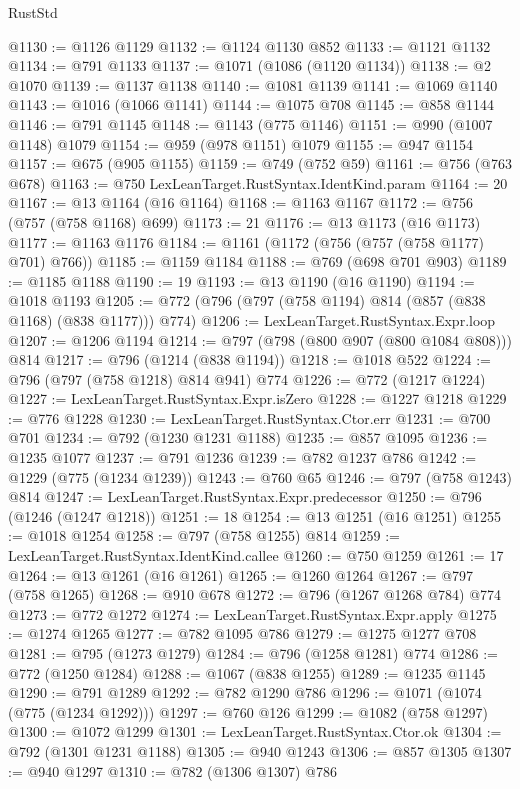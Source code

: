 \begin{lexlean}{RustStd}
\begin{coremodule}
@1130 := @1126 @1129
@1132 := @1124 @1130 @852
@1133 := @1121 @1132
@1134 := @791 @1133
@1137 := @1071 (@1086 (@1120 @1134))
@1138 := @2 @1070
@1139 := @1137 @1138
@1140 := @1081 @1139
@1141 := @1069 @1140
@1143 := @1016 (@1066 @1141)
@1144 := @1075 @708
@1145 := @858 @1144
@1146 := @791 @1145
@1148 := @1143 (@775 @1146)
@1151 := @990 (@1007 @1148) @1079
@1154 := @959 (@978 @1151) @1079
@1155 := @947 @1154
@1157 := @675 (@905 @1155)
@1159 := @749 (@752 @59)
@1161 := @756 (@763 @678)
@1163 := @750 LexLeanTarget.RustSyntax.IdentKind.param
@1164 := 20
@1167 := @13 @1164 (@16 @1164)
@1168 := @1163 @1167
@1172 := @756 (@757 (@758 @1168) @699)
@1173 := 21
@1176 := @13 @1173 (@16 @1173)
@1177 := @1163 @1176
@1184 := @1161 (@1172 (@756 (@757 (@758 @1177) @701) @766))
@1185 := @1159 @1184
@1188 := @769 (@698 @701 @903)
@1189 := @1185 @1188
@1190 := 19
@1193 := @13 @1190 (@16 @1190)
@1194 := @1018 @1193
@1205 := @772 (@796 (@797 (@758 @1194) @814 (@857 (@838 @1168) (@838 @1177))) @774)
@1206 := LexLeanTarget.RustSyntax.Expr.loop
@1207 := @1206 @1194
@1214 := @797 (@798 (@800 @907 (@800 @1084 @808))) @814
@1217 := @796 (@1214 (@838 @1194))
@1218 := @1018 @522
@1224 := @796 (@797 (@758 @1218) @814 @941) @774
@1226 := @772 (@1217 @1224)
@1227 := LexLeanTarget.RustSyntax.Expr.isZero
@1228 := @1227 @1218
@1229 := @776 @1228
@1230 := LexLeanTarget.RustSyntax.Ctor.err
@1231 := @700 @701
@1234 := @792 (@1230 @1231 @1188)
@1235 := @857 @1095
@1236 := @1235 @1077
@1237 := @791 @1236
@1239 := @782 @1237 @786
@1242 := @1229 (@775 (@1234 @1239))
@1243 := @760 @65
@1246 := @797 (@758 @1243) @814
@1247 := LexLeanTarget.RustSyntax.Expr.predecessor
@1250 := @796 (@1246 (@1247 @1218))
@1251 := 18
@1254 := @13 @1251 (@16 @1251)
@1255 := @1018 @1254
@1258 := @797 (@758 @1255) @814
@1259 := LexLeanTarget.RustSyntax.IdentKind.callee
@1260 := @750 @1259
@1261 := 17
@1264 := @13 @1261 (@16 @1261)
@1265 := @1260 @1264
@1267 := @797 (@758 @1265)
@1268 := @910 @678
@1272 := @796 (@1267 @1268 @784) @774
@1273 := @772 @1272
@1274 := LexLeanTarget.RustSyntax.Expr.apply
@1275 := @1274 @1265
@1277 := @782 @1095 @786
@1279 := @1275 @1277 @708
@1281 := @795 (@1273 @1279)
@1284 := @796 (@1258 @1281) @774
@1286 := @772 (@1250 @1284)
@1288 := @1067 (@838 @1255)
@1289 := @1235 @1145
@1290 := @791 @1289
@1292 := @782 @1290 @786
@1296 := @1071 (@1074 (@775 (@1234 @1292)))
@1297 := @760 @126
@1299 := @1082 (@758 @1297)
@1300 := @1072 @1299
@1301 := LexLeanTarget.RustSyntax.Ctor.ok
@1304 := @792 (@1301 @1231 @1188)
@1305 := @940 @1243
@1306 := @857 @1305
@1307 := @940 @1297
@1310 := @782 (@1306 @1307) @786

\end{coremodule}
\end{lexlean}
